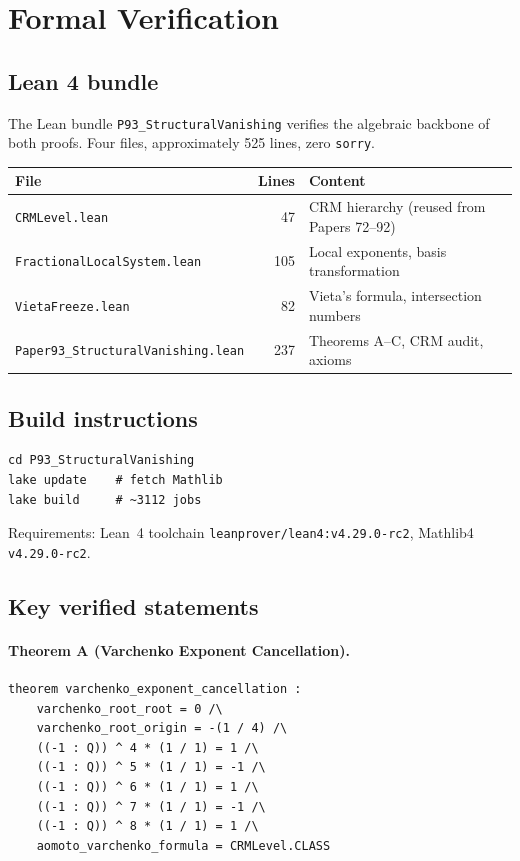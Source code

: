 \documentclass[11pt]{article}
\theoremstyle{plain}
\theoremstyle{definition}
\theoremstyle{remark}
\begin{document}
\section{Formal Verification}\label{sec:lean}

\subsection{Lean 4 bundle}

The Lean bundle \texttt{P93\_StructuralVanishing} verifies the algebraic
backbone of both proofs.  Four files, approximately 525 lines, zero \texttt{sorry}.

\begin{center}
\begin{tabular}{lrl}
\toprule
\textbf{File} & \textbf{Lines} & \textbf{Content} \\
\midrule
\texttt{CRMLevel.lean} & 47 & CRM hierarchy (reused from Papers 72--92) \\
\texttt{FractionalLocalSystem.lean} & 105 & Local exponents, basis transformation \\
\texttt{VietaFreeze.lean} & 82 & Vieta's formula, intersection numbers \\
\texttt{Paper93\_StructuralVanishing.lean} & 237 & Theorems A--C, CRM audit, axioms \\
\bottomrule
\end{tabular}
\end{center}

\subsection{Build instructions}

\begin{verbatim}
cd P93_StructuralVanishing
lake update    # fetch Mathlib
lake build     # ~3112 jobs
\end{verbatim}

Requirements: Lean~4 toolchain \texttt{leanprover/lean4:v4.29.0-rc2},
Mathlib4 \texttt{v4.29.0-rc2}.

\subsection{Key verified statements}

\paragraph{Theorem A (Varchenko Exponent Cancellation).}
{\small
\begin{verbatim}
theorem varchenko_exponent_cancellation :
    varchenko_root_root = 0 /\
    varchenko_root_origin = -(1 / 4) /\
    ((-1 : Q)) ^ 4 * (1 / 1) = 1 /\
    ((-1 : Q)) ^ 5 * (1 / 1) = -1 /\
    ((-1 : Q)) ^ 6 * (1 / 1) = 1 /\
    ((-1 : Q)) ^ 7 * (1 / 1) = -1 /\
    ((-1 : Q)) ^ 8 * (1 / 1) = 1 /\
    aomoto_varchenko_formula = CRMLevel.CLASS
\end{verbatim}
}
\end{document}

